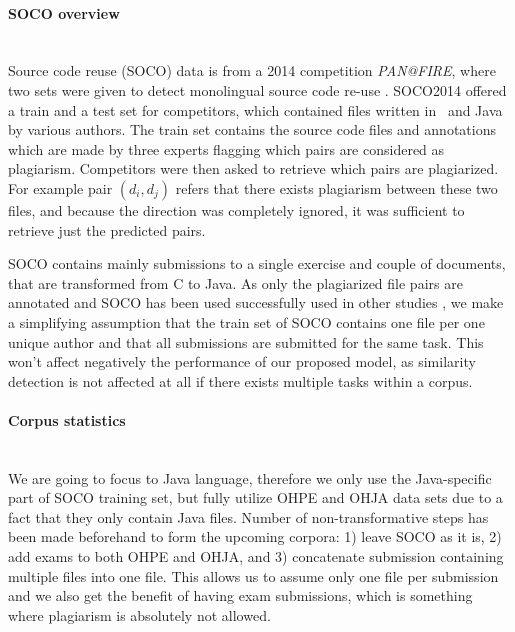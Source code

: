 \paragraph{SOCO overview}\mbox{}\\
Source code reuse (SOCO) data is from a 2014 competition \emph{PAN@FIRE}, where two sets were given to detect monolingual source code re-use \cite{saez2014pan}. SOCO2014 offered a train and a test set for competitors, which contained files written in \cpp\, and Java by various authors. The train set contains the source code files and annotations which are made by three experts flagging which pairs are considered as plagiarism. Competitors were then asked to retrieve which pairs are plagiarized. For example pair $(d_i, d_j)$ refers that there exists plagiarism between these two files, and because the direction was completely ignored, it was sufficient to retrieve just the predicted pairs.

SOCO contains mainly submissions to a single exercise and couple of documents, that are transformed from C to Java. As only the plagiarized file pairs are annotated and SOCO has been used successfully used in other studies \cite{AIR2015, RCISCP2017, OTIOLSS2015, USCR2014}, we make a simplifying assumption that the train set of SOCO contains one file per one unique author and that all submissions are submitted for the same task. This won't affect negatively the performance of our proposed model, as similarity detection is not affected at all if there exists multiple tasks within a corpus. 



\paragraph{Corpus statistics}\mbox{}\\
We are going to focus to Java language, therefore we only use the Java-specific part of SOCO training set, but fully utilize OHPE and OHJA data sets due to a fact that they only contain Java files. Number of non-transformative steps has been made beforehand to form the upcoming corpora: 1) leave SOCO as it is, 2) add exams to both OHPE and OHJA, and 3) concatenate submission containing multiple files into one file. This allows us to assume only one file per submission and we also get the benefit of having exam submissions, which is something where plagiarism is absolutely not allowed. 


